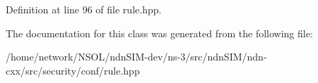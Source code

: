 Definition at line 96 of file rule.\+hpp.



The documentation for this class was generated from the following file\+:\begin{DoxyCompactItemize}
\item 
/home/network/\+N\+S\+O\+L/ndn\+S\+I\+M-\/dev/ns-\/3/src/ndn\+S\+I\+M/ndn-\/cxx/src/security/conf/rule.\+hpp\end{DoxyCompactItemize}
